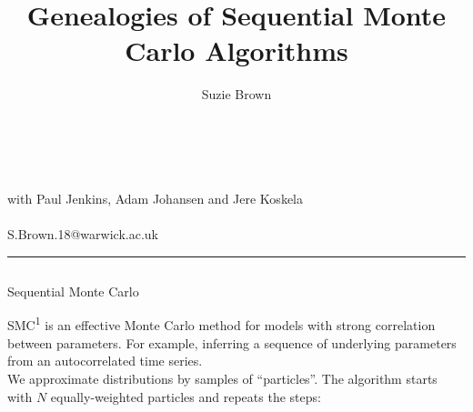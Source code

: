 \documentclass[final, 12pt]{beamer}
\title{Genealogies of Sequential Monte Carlo Algorithms}
\author{Suzie Brown}
\institute{Department of Statistics, University of Warwick}
\date{}
\newlength{\colwidth}
\begin{document}
\begin{frame}

\vspace*{-20pt}

\centering
{}

\vspace*{-360pt}

\huge{\inserttitle}\\[2pt]
\LARGE{\insertauthor}\\[7pt]
\large{with Paul Jenkins, Adam Johansen and Jere Koskela}\\[7pt]
\normalsize{\insertinstitute}\\[5pt]
\normalsize{S.Brown.18@warwick.ac.uk}\\[25pt]

\vspace*{5pt}

\hrule

\vspace*{-10pt}

\begin{columns}
\begin{column}{\colwidth}
\begin{block}{Sequential Monte Carlo}

SMC\textsuperscript{1} is an effective Monte Carlo method for models with strong correlation between parameters. For example, inferring a sequence of underlying parameters from an autocorrelated time series.\\[16pt]

We approximate distributions by samples of ``particles''. The algorithm starts with $N$ equally-weighted particles and repeats the steps:
\begin{center}
\end{center}
\end{block}
\end{column}
\end{columns}
\end{frame}
\end{document}
